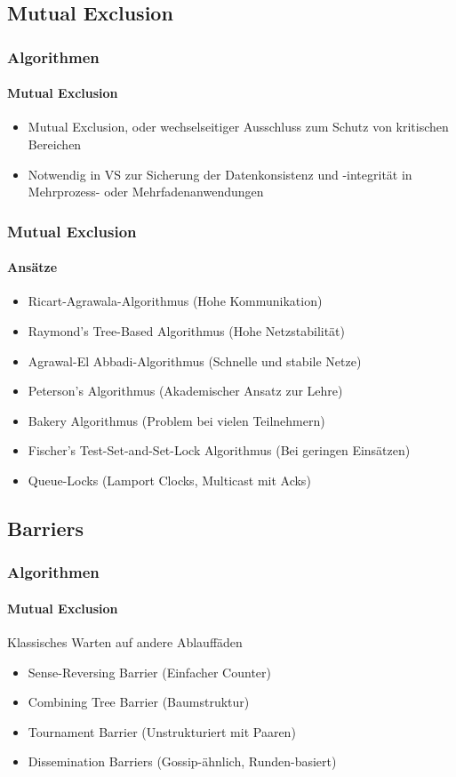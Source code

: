 \subsection{Mutual Exclusion}
\begin{frame}
  \frametitle{Algorithmen}
  \framesubtitle{Mutual Exclusion}
  \begin{itemize}
    \item Mutual Exclusion, oder wechselseitiger Ausschluss zum Schutz von kritischen Bereichen
    \item Notwendig in VS zur Sicherung der Datenkonsistenz und -integrität in Mehrprozess- oder Mehrfadenanwendungen
  \end{itemize}
\end{frame}

\begin{frame}
  \frametitle{Mutual Exclusion}
  \framesubtitle{Ansätze}
  \begin{itemize}
    \item Ricart-Agrawala-Algorithmus (Hohe Kommunikation)
    \item Raymond's Tree-Based Algorithmus (Hohe Netzstabilität)
    \item Agrawal-El Abbadi-Algorithmus (Schnelle und stabile Netze)
    \item Peterson's Algorithmus (Akademischer Ansatz zur Lehre)
    \item Bakery Algorithmus (Problem bei vielen Teilnehmern)
    \item Fischer's Test-Set-and-Set-Lock Algorithmus (Bei geringen Einsätzen)
    \item  Queue-Locks (Lamport Clocks, Multicast mit Acks)
  \end{itemize}
\end{frame}

\subsection{Barriers}
\begin{frame}
  \frametitle{Algorithmen}
  \framesubtitle{Mutual Exclusion}
  Klassisches Warten auf andere Ablauffäden
  \begin{itemize}
    \item Sense-Reversing Barrier (Einfacher Counter)
    \item Combining Tree Barrier  (Baumstruktur)
    \item Tournament Barrier      (Unstrukturiert mit Paaren)
    \item Dissemination Barriers  (Gossip-ähnlich, Runden-basiert)
  \end{itemize}
\end{frame}